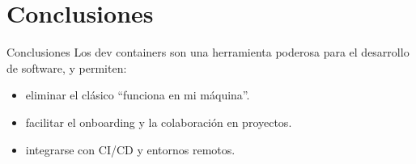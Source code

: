 \documentclass{beamer}
\begin{document}
\section{Conclusiones}
\begin{frame}{Conclusiones}
  Los dev containers son una herramienta poderosa para el desarrollo de software, y permiten:
  \begin{itemize}
    \item eliminar el clásico “funciona en mi máquina”.
    \item facilitar el onboarding y la colaboración en proyectos.
    \item integrarse con CI/CD y entornos remotos.
  \end{itemize}
\end{frame}
\end{document}
